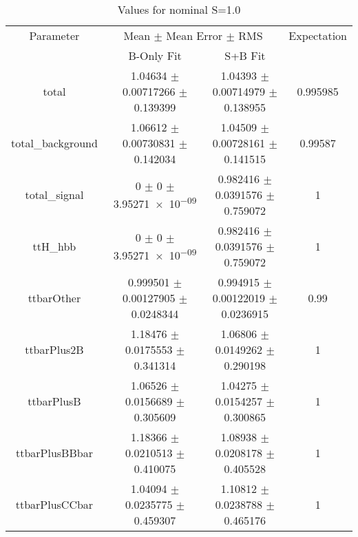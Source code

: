 \begin{table}
\centering
\caption{Values for nominal S=1.0}
\begin{tabular}{cccc}
\toprule
Parameter & \multicolumn{2}{c}{Mean $\pm$ Mean Error $\pm$ RMS} & Expectation\\
 & B-Only Fit & S+B Fit & \\
\midrule
total & \num{1.04634} $\pm$ \num{0.00717266} $\pm$ \num{0.139399} & \num{1.04393} $\pm$ \num{0.00714979} $\pm$ \num{0.138955} & \num{0.995985}\\
total\_background & \num{1.06612} $\pm$ \num{0.00730831} $\pm$ \num{0.142034} & \num{1.04509} $\pm$ \num{0.00728161} $\pm$ \num{0.141515} & \num{0.99587}\\
total\_signal & \num{0} $\pm$ \num{0} $\pm$ \num{3.95271e-09} & \num{0.982416} $\pm$ \num{0.0391576} $\pm$ \num{0.759072} & \num{1}\\
ttH\_hbb & \num{0} $\pm$ \num{0} $\pm$ \num{3.95271e-09} & \num{0.982416} $\pm$ \num{0.0391576} $\pm$ \num{0.759072} & \num{1}\\
ttbarOther & \num{0.999501} $\pm$ \num{0.00127905} $\pm$ \num{0.0248344} & \num{0.994915} $\pm$ \num{0.00122019} $\pm$ \num{0.0236915} & \num{0.99}\\
ttbarPlus2B & \num{1.18476} $\pm$ \num{0.0175553} $\pm$ \num{0.341314} & \num{1.06806} $\pm$ \num{0.0149262} $\pm$ \num{0.290198} & \num{1}\\
ttbarPlusB & \num{1.06526} $\pm$ \num{0.0156689} $\pm$ \num{0.305609} & \num{1.04275} $\pm$ \num{0.0154257} $\pm$ \num{0.300865} & \num{1}\\
ttbarPlusBBbar & \num{1.18366} $\pm$ \num{0.0210513} $\pm$ \num{0.410075} & \num{1.08938} $\pm$ \num{0.0208178} $\pm$ \num{0.405528} & \num{1}\\
ttbarPlusCCbar & \num{1.04094} $\pm$ \num{0.0235775} $\pm$ \num{0.459307} & \num{1.10812} $\pm$ \num{0.0238788} $\pm$ \num{0.465176} & \num{1}\\
\bottomrule
\end{tabular}
\end{table}